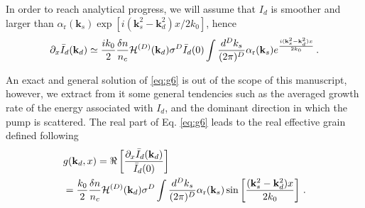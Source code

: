 \documentclass[
 reprint,
 amsmath,amssymb,
 aps,
]{revtex4-1}
\begin{document}
\begin{widetext}
In order to reach analytical progress, we will assume that $I_d$ is  smoother and larger  than $\alpha_\mathrm{r}(\mathbf{k}_s) 
\exp[i(\mathbf{k}_s^2-\mathbf{k}_d^2)x / 2k_0]$, hence 
\begin{align}
\partial_x\Bar{I}_d(\mathbf{k}_d)\simeq  \frac{ik_0}{2}  \frac{\delta n}{n_c}
 \mathcal{H}^{(D)}(\mathbf{k}_d) \sigma^D \Bar{I}_d(0) \int \frac{d^Dk_s}{(2\pi)^D}  \alpha_\mathrm{r}(\mathbf{k}_s) 
e^{\frac{i(\mathbf{k}_s^2-\mathbf{k}_d^2)x}{2k_0}} 
\, . \label{eq:g6}
\end{align}
 \end{widetext}
 
An exact and general solution of \eqref{eq:g6} is out of the scope of this manuscript, however, we extract from it some general tendencies such as the averaged growth rate of the energy associated with $I_d$, and the dominant direction in which the pump is scattered. The real part of  Eq. \eqref{eq:g6} leads to the real effective  grain defined following
\begin{align}
&g(\mathbf{k}_d,x) = \Re\left[\frac{\partial_x\Bar{I}_d(\mathbf{k}_d)}{\Bar{I}_d(0)}\right] \nonumber \\
&=  \frac{k_0}{2}  \frac{\delta n}{n_c}
 \mathcal{H}^{(D)}(\mathbf{k}_d)  \sigma^D \int \frac{d^Dk_s}{(2\pi)^D}  \alpha_\mathrm{r}(\mathbf{k}_s) 
\sin\left[ \frac{(\mathbf{k}_s^2-\mathbf{k}_d^2)x}{2k_0}\right]
\, . \label{eq:gainkd}
\end{align}
 
\end{document}
